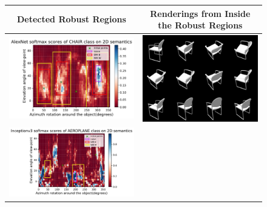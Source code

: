 \begin{figure}[h]
\centering
\tabcolsep=0.03cm
   \begin{tabular}[!t]{c|c}  \hline
   \textbf{Detected Robust Regions} & \textbf{Renderings from Inside the Robust Regions} \\  \hline
\includegraphics[width = 8.5cm]{supimages/qualitative/AlexNet_chair_6_regions.pdf} &
 \includegraphics[width = 7.5cm]{supimages/qualitative/chair/chair_s.png}\\ \hline 
 \includegraphics[width = 9.5cm]{supimages/qualitative/Inceptionv3_aeroplane_7_regions.pdf} & 

\end{tabular}
\end{figure}
